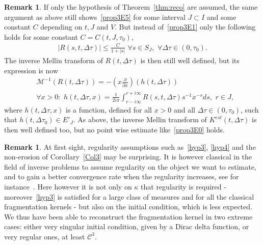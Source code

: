 \documentclass[10pt]{amsart}
\theoremstyle{definition}\newtheorem{defi}[theo]{Definition}\newtheorem{rema}[theo]{Remark}\newtheorem{exam}[theo]{Example}\newtheorem{exem}[theo]{Example}\newtheorem{nota}[theo]{Notation}
\newcommand*\M{\mathcal{M}}
\newcommand{\clC}{\mathcal{C}}
\let\oldforall\forall
\renewcommand*{\forall}{\mathrel{\oldforall}}
\begin{document}
\begin{rema}
If only the hypothesis of Theorem~\ref{thm:reco} are assumed, the same argument as above still shows~\eqref{prop3E5} for some interval $J\subset I$ and some constant $C$ depending on $t, J$ and $V$. But instead of~\eqref{prop3E1} only the following holds for some constant $C=C(t, J, \tau _0)$,
\begin{align}\label{prop3E7}
\left|R(s, t, \Delta \tau)\right|\le \frac{C}{1+|s|}\,\,\forall s\in S_J,\,\,\forall \Delta \tau \in (0, \tau _0).
\end{align}
The inverse Mellin transform of $R(t, \Delta \tau)$ is then still well defined, but its expression is now
\begin{align*}
&\M^{-1}(R(t, \Delta \tau))=-\left(x \frac{\partial}{\partial x}\right)(h(t, \Delta \tau))\\
&\forall x>0:\,\,h(t, \Delta \tau, x)= \frac {1} {2i\pi }\int _{ r-i\infty }^{r+i\infty} R(s, t, \Delta \tau)s^{-1}x^{-s}ds,\,\,r\in J,
\end{align*}
where $h(t, \Delta \tau, x)$ is a function, defined for all $x>0$ and all $\Delta \tau\in (0, \tau _0)$, such that $h(t, \Delta \tau _0)\in E'_J$. As above, the inverse Mellin transform of $K^{est}(t, \Delta \tau)$ is then well defined too, but no point wise estimate like~\eqref{prop3E0} holds.
\end{rema}


\begin{rema}
At first sight, regularity assumptions such as~\eqref{hyp3}, \eqref{hyp4} and the non-erosion of Corollary~\ref{Col3} may be surprising. It is however classical in the field of inverse problems to assume regularity on the object we want to estimate, and to gain a better convergence rate when the regularity increases, see for instance~\cite{Engl}. Here however it is not only on $\kappa$ that regularity is required - moreover~\eqref{hyp3} is satisfied for a large class of measures and for all the classical fragmentation kernels - but also on the initial condition, which is less expected. We thus have been able to reconstruct the fragmentation kernel in two extreme cases: either very singular initial condition, given by a Dirac delta function, or very regular ones, at least $\clC ^3$.
\end{rema}
\end{document}
